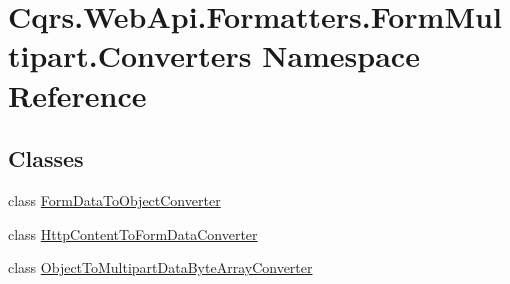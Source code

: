\hypertarget{namespaceCqrs_1_1WebApi_1_1Formatters_1_1FormMultipart_1_1Converters}{}\section{Cqrs.\+Web\+Api.\+Formatters.\+Form\+Multipart.\+Converters Namespace Reference}
\label{namespaceCqrs_1_1WebApi_1_1Formatters_1_1FormMultipart_1_1Converters}
\subsection*{Classes}
\begin{DoxyCompactItemize}
\item 
class \hyperlink{classCqrs_1_1WebApi_1_1Formatters_1_1FormMultipart_1_1Converters_1_1FormDataToObjectConverter}{Form\+Data\+To\+Object\+Converter}
\item 
class \hyperlink{classCqrs_1_1WebApi_1_1Formatters_1_1FormMultipart_1_1Converters_1_1HttpContentToFormDataConverter}{Http\+Content\+To\+Form\+Data\+Converter}
\item 
class \hyperlink{classCqrs_1_1WebApi_1_1Formatters_1_1FormMultipart_1_1Converters_1_1ObjectToMultipartDataByteArrayConverter}{Object\+To\+Multipart\+Data\+Byte\+Array\+Converter}
\end{DoxyCompactItemize}
